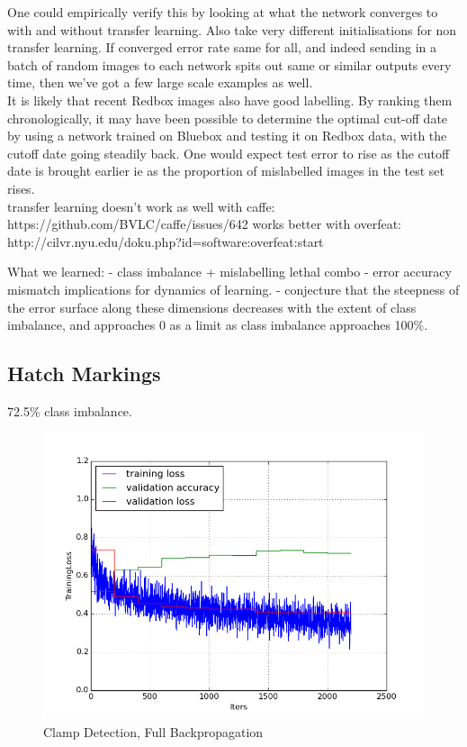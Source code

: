\documentclass[a4paper,11pt]{article}
\begin{document}
One could empirically verify this by looking at what the network converges to with and without transfer learning. Also take very different initialisations for non transfer learning. If converged error rate same for all, and indeed sending in a batch of random images to each network spits out same or similar outputs every time, then we've got a few large scale examples as well. \\

It is likely that recent Redbox images also have good labelling. By ranking them chronologically, it may have been possible to determine the optimal cut-off date by using a network trained on Bluebox and testing it on Redbox data, with the cutoff date going steadily back. One would expect test error to rise as the cutoff date is brought earlier ie as the proportion of mislabelled images in the test set rises. \\

transfer learning doesn't work as well with caffe:
https://github.com/BVLC/caffe/issues/642
works better with overfeat: http://cilvr.nyu.edu/doku.php?id=software:overfeat:start

What we learned:
- class imbalance + mislabelling lethal combo
- error accuracy mismatch implications for dynamics of learning.
- conjecture that the steepness of the error surface along these dimensions decreases with the extent of class imbalance, and approaches 0 as a limit as class imbalance approaches 100\%.


\subsection{Hatch Markings}

72.5\% class imbalance. 



\begin{figure}[h!]
	\centering
	\includegraphics[scale=0.5]{images/plot_hatch_markings_noneC.png}
	\caption{Clamp Detection, Full Backpropagation}
\end{figure}
\end{document}
